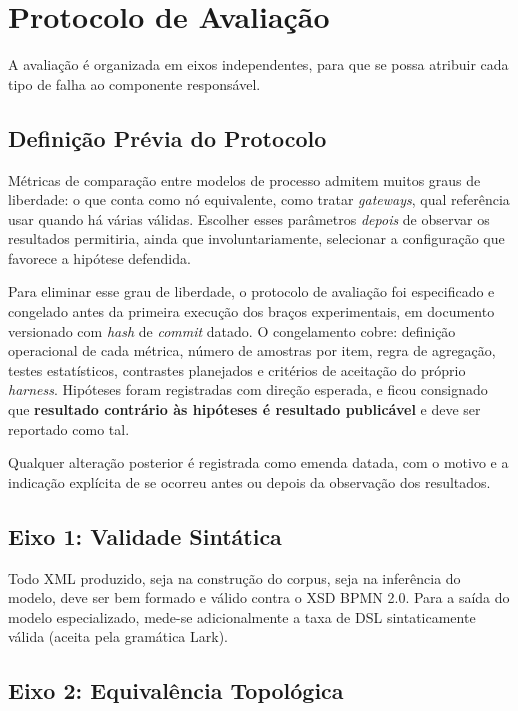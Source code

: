 \section{Protocolo de Avaliação}
\label{sec:avaliacao}

A avaliação é organizada em eixos independentes, para que se possa atribuir cada tipo de falha ao componente responsável.

\subsection{Definição Prévia do Protocolo}
\label{sec:pre-registro}

Métricas de comparação entre modelos de processo admitem muitos graus de liberdade: o que conta como nó equivalente, como tratar \textit{gateways}, qual referência usar quando há várias válidas. Escolher esses parâmetros \textit{depois} de observar os resultados permitiria, ainda que involuntariamente, selecionar a configuração que favorece a hipótese defendida.

Para eliminar esse grau de liberdade, o protocolo de avaliação foi especificado e congelado antes da primeira execução dos braços experimentais, em documento versionado com \textit{hash} de \textit{commit} datado. O congelamento cobre: definição operacional de cada métrica, número de amostras por item, regra de agregação, testes estatísticos, contrastes planejados e critérios de aceitação do próprio \textit{harness}. Hipóteses foram registradas com direção esperada, e ficou consignado que \textbf{resultado contrário às hipóteses é resultado publicável} e deve ser reportado como tal.

Qualquer alteração posterior é registrada como emenda datada, com o motivo e a indicação explícita de se ocorreu antes ou depois da observação dos resultados.


\subsection{Eixo 1: Validade Sintática}
\label{subsec:eixo1}

Todo XML produzido, seja na construção do corpus, seja na inferência do modelo, deve ser bem formado e válido contra o XSD BPMN 2.0. Para a saída do modelo especializado, mede-se adicionalmente a taxa de DSL sintaticamente válida (aceita pela gramática Lark).

\subsection{Eixo 2: Equivalência Topológica}
\label{subsec:eixo2}

